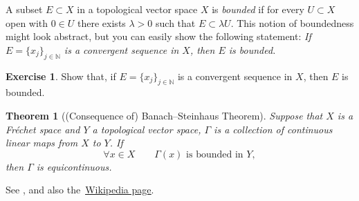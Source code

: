 \documentclass[a4paper,9pt]{amsart}
\newcommand{\N}{\mathbb{N}}	%
\theoremstyle{plain}
\newtheorem{theorem}[proposition]{Theorem}
\theoremstyle{definition}
\newtheorem{exercise}[proposition]{Exercise}%
\theoremstyle{remark}
\begin{document}
A subset $E\subset X$ in a topological vector space $X$ is \emph{bounded} if for every $U\subset X$ open with $0\in U$ there exists $\lambda>0$ such that $E\subset \lambda U$.
This notion of boundedness might look abstract, but you can easily show the following statement:
{\it If $E=\{x_j\}_{j\in\N}$ is a convergent sequence in $X$, then $E$ is bounded.}

\begin{exercise}
	Show that, if $E=\{x_j\}_{j\in\N}$ is a convergent sequence in $X$, then $E$ is bounded.
\end{exercise}

\begin{theorem}[(Consequence of) Banach--Steinhaus Theorem]\label{thm67e96360}
	Suppose that $X$ is a Fréchet space and $Y$ a topological vector space, 
	$\Gamma$ is a collection of continuous linear maps from $X$ to $Y$.
	If 
	\begin{equation}
		\forall x\in X\qquad \Gamma(x) \text{ is bounded in $Y$} ,
	\end{equation}
	then $\Gamma$ is equicontinuous.
\end{theorem}

See \cite[\S2.1--\S2.6]{MR1157815}, and also the~\href{https://en.wikipedia.org/wiki/Uniform_boundedness_principle}{\underline{Wikipedia page}}.
\end{document}
